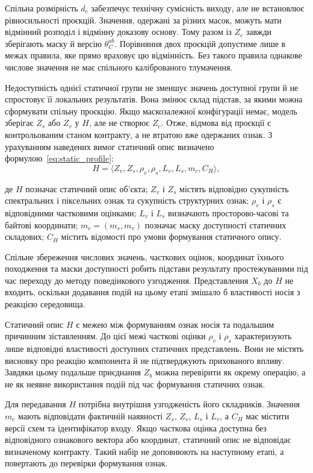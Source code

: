 Спільна розмірність $d_c$ забезпечує технічну сумісність виходу, але не встановлює рівносильності проєкцій. Значення, одержані за різних масок, можуть мати відмінний розподіл і відмінну доказову основу. Тому разом із $Z_c$ завжди зберігають маску й версію $\theta_C^{ab}$. Порівняння двох проєкцій допустиме лише в межах правила, яке прямо враховує цю відмінність. Без такого правила однакове числове значення не має спільного каліброваного тлумачення.

Недоступність однієї статичної групи не зменшує значень доступної групи й не спростовує її локальних результатів. Вона змінює склад підстав, за якими можна сформувати спільну проєкцію. Якщо маскозалежної конфігурації немає, модель зберігає $Z_s$ або $Z_v$ у $H$, але не створює $Z_c$. Отже, відмова від проєкції є контрольованим станом контракту, а не втратою вже одержаних ознак. З урахуванням наведених вимог статичний опис визначено формулою~\eqref{eq:static_profile}:
\begin{equation}
H=\langle Z_v,Z_s,\rho_v,\rho_s,L_v,L_s,m_c,C_H\rangle,
\label{eq:static_profile}
\end{equation}

де $H$ позначає статичний опис об’єкта; $Z_v$ і $Z_s$ містять відповідно сукупність спектральних і піксельних ознак та сукупність структурних ознак; $\rho_v$ і $\rho_s$ є відповідними частковими оцінками; $L_v$ і $L_s$ визначають просторово-часові та байтові координати; $m_c=(m_s,m_v)$ позначає маску доступності статичних складових; $C_H$ містить відомості про умови формування статичного опису.

Спільне збереження числових значень, часткових оцінок, координат їхнього походження та маски доступності робить підстави результату простежуваними під час переходу до методу поведінкового узгодження. Представлення $X_b$ до $H$ не входить, оскільки додавання подій на цьому етапі змішало б властивості носія з реакцією середовища.

Статичний опис $H$ є межею між формуванням ознак носія та подальшим причинним зіставленням. До цієї межі часткові оцінки $\rho_v$ і $\rho_s$ характеризують лише відповідні властивості доступних статичних представлень. Вони не містять висновку про реакцію компонента й не підтверджують прихованого впливу. Завдяки цьому подальше приєднання $Z_b$ можна перевірити як окрему операцію, а не як неявне використання подій під час формування статичних ознак.

Для передавання $H$ потрібна внутрішня узгодженість його складників. Значення $m_c$ мають відповідати фактичній наявності $Z_s$, $Z_v$, $L_s$ і $L_v$, а $C_H$ має містити версії схем та ідентифікатор входу. Якщо часткова оцінка доступна без відповідного ознакового вектора або координат, статичний опис не відповідає визначеному контракту. Такий набір не доповнюють на наступному етапі, а повертають до перевірки формування ознак.

